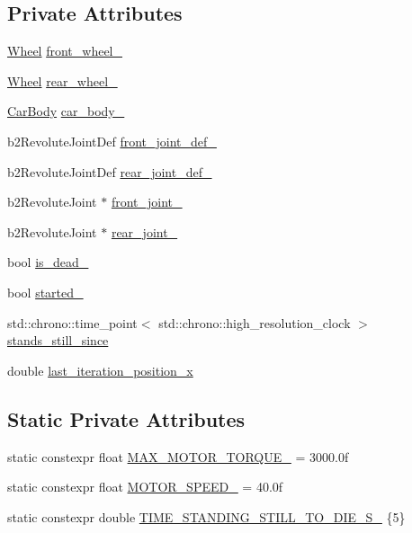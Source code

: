 \subsection*{Private Attributes}
\begin{DoxyCompactItemize}
\item 
\hyperlink{classWheel}{Wheel} \hyperlink{classCar_a9c6abcefc82b364b09e67fad1b200beb}{front\+\_\+wheel\+\_\+}
\item 
\hyperlink{classWheel}{Wheel} \hyperlink{classCar_a2c29a444d66ee10134352516e42c3e0d}{rear\+\_\+wheel\+\_\+}
\item 
\hyperlink{classCarBody}{Car\+Body} \hyperlink{classCar_a6a0d40752a134fb4f0693a28a4e64a0d}{car\+\_\+body\+\_\+}
\item 
b2\+Revolute\+Joint\+Def \hyperlink{classCar_a4e2939a9c523e2e264ea2377a4829f7c}{front\+\_\+joint\+\_\+def\+\_\+}
\item 
b2\+Revolute\+Joint\+Def \hyperlink{classCar_a6d59c94896a5b765761b89b0ae3b8e64}{rear\+\_\+joint\+\_\+def\+\_\+}
\item 
b2\+Revolute\+Joint $\ast$ \hyperlink{classCar_a65195e0f8bdcb242616b6c285d7ff07a}{front\+\_\+joint\+\_\+}
\item 
b2\+Revolute\+Joint $\ast$ \hyperlink{classCar_ac916d27d34a5a9aa07129894b79f1aa7}{rear\+\_\+joint\+\_\+}
\item 
bool \hyperlink{classCar_a73e9873dd2c3c0ab7bbd6623ac9085a8}{is\+\_\+dead\+\_\+}
\item 
bool \hyperlink{classCar_a348ee6b161f174a80ed4c38f9f84d789}{started\+\_\+}
\item 
std\+::chrono\+::time\+\_\+point$<$ std\+::chrono\+::high\+\_\+resolution\+\_\+clock $>$ \hyperlink{classCar_a164067ddfd603614a22d9c178bfa6308}{stands\+\_\+still\+\_\+since}
\item 
double \hyperlink{classCar_ac74055f1a48feb09e7c15714125ee190}{last\+\_\+iteration\+\_\+position\+\_\+x}
\end{DoxyCompactItemize}
\subsection*{Static Private Attributes}
\begin{DoxyCompactItemize}
\item 
static constexpr float \hyperlink{classCar_a70cd98e49fe96eec0bc4f0c414fd8e19}{M\+A\+X\+\_\+\+M\+O\+T\+O\+R\+\_\+\+T\+O\+R\+Q\+U\+E\+\_\+} = 3000.\+0f
\item 
static constexpr float \hyperlink{classCar_a371b4dcd77eb566677d633db4dd457ae}{M\+O\+T\+O\+R\+\_\+\+S\+P\+E\+E\+D\+\_\+} = 40.\+0f
\item 
static constexpr double \hyperlink{classCar_aa988813339e3a1a8484484ac74b3d4e0}{T\+I\+M\+E\+\_\+\+S\+T\+A\+N\+D\+I\+N\+G\+\_\+\+S\+T\+I\+L\+L\+\_\+\+T\+O\+\_\+\+D\+I\+E\+\_\+\+S\+\_\+} \{5\}
\end{DoxyCompactItemize}


